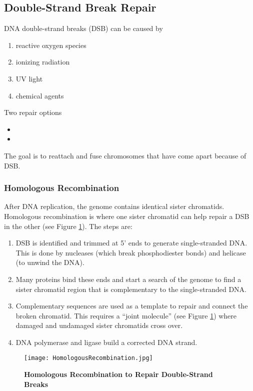 \documentclass[../Bio_chemistryReview.tex]{subfiles}
\begin{document}
\subsection{Double-Strand Break Repair}
DNA double-strand breaks (DSB) can be caused by
\begin{enumerate}
  \item reactive oxygen species
  \item ionizing radiation
  \item UV light
  \item chemical agents
\end{enumerate}
Two repair options
\begin{itemize}
  \item {}
  \item {}
\end{itemize}
The goal is to reattach and fuse chromosomes that have come apart because of
DSB.

\subsubsection{Homologous Recombination}
After DNA replication, the genome contains identical sister chromatids.
Homologous recombination is where one sister chromatid can help repair a DSB in
the other (see Figure \ref{fig:HomoRecomb}). The steps are:
\begin{enumerate}
  \item DSB is identified and trimmed at 5' ends to generate single-stranded
    DNA. This is done by nucleases (which break phosphodiester bonds) and
    helicase (to unwind the DNA).
  \item Many proteins bind these ends and start a search of the genome to find a
    sister chromatid region that is complementary to the single-stranded DNA.
  \item Complementary sequences are used as a template to repair and connect the
    broken chromatid. This requires a ``joint molecule'' (see Figure
    \ref{fig:HomoRecomb}) where damaged and undamaged sister chromatids cross
    over.
  \item DNA polymerase and ligase build a corrected DNA strand.
\end{enumerate}

\begin{figure}[H]
  \centering
  \texttt{[image: HomologousRecombination.jpg]}
  \caption{\textbf{Homologous Recombination to Repair Double-Strand Breaks}}
  \label{fig:HomoRecomb}
\end{figure}
\end{document}
